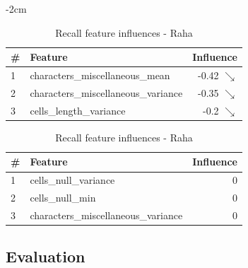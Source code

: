 \begin{table}[H]
	\centering
	\addtolength{\leftskip} {-2cm}
	\addtolength{\rightskip}{-2cm}
	\captionsetup[subtable]{position = below}
	\captionsetup[table]{position=top}
	\caption{Top feature influences - Raha}
	\label{tab:feature_influences_Raha}
		\begin{subtable}{0.5\linewidth}
		\centering
		\begin{tabular}{llr}
\toprule
 \# &                              Feature &         Influence \\
\midrule
 1 &      characters\_miscellaneous\_mean &  -0.42 $\searrow$ \\
 2 &  characters\_miscellaneous\_variance &  -0.35 $\searrow$ \\
 3 &              cells\_length\_variance &   -0.2 $\searrow$ \\
\bottomrule
\end{tabular}
		\caption{Precision feature influences - Raha}
		\label{tab:prec_feature_influences_Raha}
	\end{subtable}
	\hspace*{4em}
	\begin{subtable}{0.5\linewidth}
		\centering
\begin{tabular}{llr}
\toprule
 \# &                              Feature & Influence \\
\midrule
 1 &                cells\_null\_variance &         0 \\
 2 &                     cells\_null\_min &         0 \\
 3 &  characters\_miscellaneous\_variance &         0 \\
\bottomrule
\end{tabular}
		\caption{Recall feature influences - Raha}
		\label{tab:rec_feature_influences_Raha}
	\end{subtable}%
\end{table}

\newpage
\subsection{Evaluation}
\newpage
